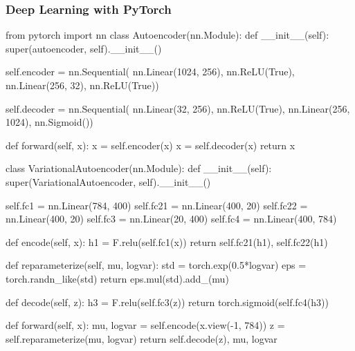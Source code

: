 \documentclass{beamer}
\begin{document}
\begin{frame}[fragile]\frametitle{Deep Learning with PyTorch} 
    \begin{pythoncode}
        from pytorch import nn
        class Autoencoder(nn.Module):
            def __init__(self):
                super(autoencoder, self).__init__()

                self.encoder = nn.Sequential(
                    nn.Linear(1024, 256),
                    nn.ReLU(True),
                    nn.Linear(256, 32),
                    nn.ReLU(True))

                self.decoder = nn.Sequential(
                    nn.Linear(32, 256),
                    nn.ReLU(True),
                    nn.Linear(256, 1024),
                    nn.Sigmoid())

            def forward(self, x):
                x = self.encoder(x)
                x = self.decoder(x)
                return x
    \end{pythoncode}
\end{frame}

\begin{frame}%
    \begin{pythoncode}
class VariationalAutoencoder(nn.Module):
    def __init__(self):
        super(VariationalAutoencoder, self).__init__()

        self.fc1  = nn.Linear(784, 400)
        self.fc21 = nn.Linear(400, 20)
        self.fc22 = nn.Linear(400, 20)
        self.fc3  = nn.Linear(20, 400)
        self.fc4  = nn.Linear(400, 784)

    def encode(self, x):
        h1 = F.relu(self.fc1(x))
        return self.fc21(h1), self.fc22(h1)

    def reparameterize(self, mu, logvar):
        std = torch.exp(0.5*logvar)
        eps = torch.randn_like(std)
        return eps.mul(std).add_(mu)

    def decode(self, z):
        h3 = F.relu(self.fc3(z))
        return torch.sigmoid(self.fc4(h3))

    def forward(self, x):
        mu, logvar = self.encode(x.view(-1, 784))
        z = self.reparameterize(mu, logvar)
        return self.decode(z), mu, logvar
    \end{pythoncode}
\end{frame}
\end{document}
